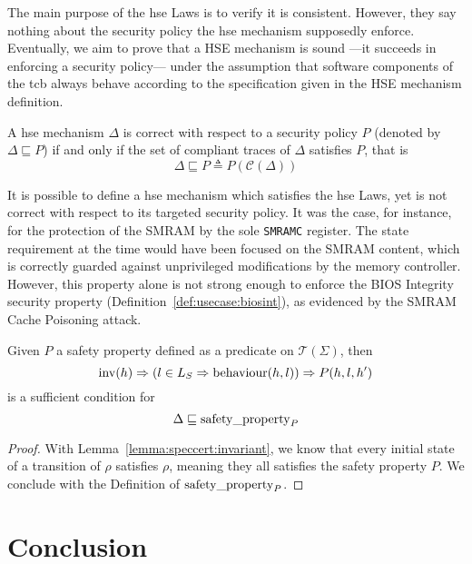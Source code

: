 The main purpose of the \ac{hse} Laws is to verify it is consistent.
%
However, they say nothing about the security policy the \ac{hse} mechanism
supposedly enforce.
%
Eventually, we aim to prove that a HSE mechanism is sound ---it succeeds in
enforcing a security policy--- under the assumption that software components of
the \ac{tcb} always behave according to the specification given in the HSE
mechanism definition.

\begin{definition}
  A \ac{hse} mechanism $\Delta$ is correct with respect to a security policy $P$
  (denoted by $\Delta \sqsubseteq P$) if and only if the set of compliant traces
  of $\Delta$ satisfies $P$, that is
  \[
    \Delta \sqsubseteq P \triangleq P(\mathcal{C}(\Delta))
  \]
\end{definition}

It is possible to define a \ac{hse} mechanism which satisfies the \ac{hse} Laws,
yet is not correct with respect to its targeted security policy.
%
It was the case, for instance, for the protection of the SMRAM by the sole
\texttt{SMRAMC} register.
%
The state requirement at the time would have been focused on the SMRAM content,
which is correctly guarded against unprivileged modifications by the memory
controller.
%
However, this property alone is not strong enough to enforce the BIOS Integrity
security property (Definition~\ref{def:usecase:biosint}), as evidenced by the
SMRAM Cache Poisoning attack.

\begin{theorem}
  Given $P$ a safety property defined as a predicate on $\mathcal{T}(\Sigma)$,
  then
  \[
    \mathrm{inv}(h) \Rightarrow (l \in L_S \Rightarrow \mathrm{behaviour}(h, l))
    \Rightarrow P(h, l, h')
  \]
  is a sufficient condition for
  \[
    \Delta \sqsubseteq \mathrm{safety\_property}_{P}
  \]

  \begin{proof}
    With Lemma~\ref{lemma:speccert:invariant}, we know that every initial state
    of a transition of $\rho$ satisfies $\rho$, meaning they all satisfies the
    safety property $P$.
    We conclude with the Definition of $\mathrm{safety\_property}_{P}$.
  \end{proof}
\end{theorem}

\section{Conclusion}

